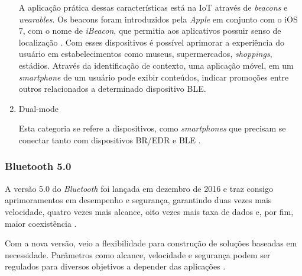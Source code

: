 \begin{enumerate}[label=(\Alph*)]
    A aplicação prática dessas características está na IoT através de \textit{beacons} e \textit{wearables}. Os beacons foram introduzidos pela \textit{Apple}\textsuperscript{\textregistered} em conjunto com o iOS 7, com o nome de \textit{iBeacon}, que permitia aos aplicativos possuir senso de localização \cite{Apple2014}. Com esses dispositivos é possível aprimorar a experiência do usuário em estabelecimentos como museus, supermercados, \textit{shoppings}, estádios. Através da identificação de contexto, uma aplicação móvel, em um \textit{smartphone} de um usuário pode exibir conteúdos, indicar promoções entre outros relacionados a determinado dispositivo BLE.
    
    \item{Dual-mode}
    
    Esta categoria se refere a dispositivos, como \textit{smartphones} que precisam se conectar tanto com dispositivos BR/EDR e BLE \cite{BluetoothSIG2017a}.

\end{enumerate}

\ProximoForaDoSumario
\subsubsection{Bluetooth 5.0}

A versão 5.0 do \textit{Bluetooth} foi lançada em dezembro de 2016 e traz consigo aprimoramentos em desempenho e segurança, garantindo duas vezes mais velocidade, quatro vezes mais alcance, oito vezes mais taxa de dados e, por fim, maior coexistência \cite{BluetoothSIG2017b}. 

Com a nova versão, veio a flexibilidade para construção de soluções baseadas em necessidade. Parâmetros como alcance, velocidade e segurança podem ser regulados para diversos objetivos a depender das aplicações \cite{BluetoothSIG2017b}.



